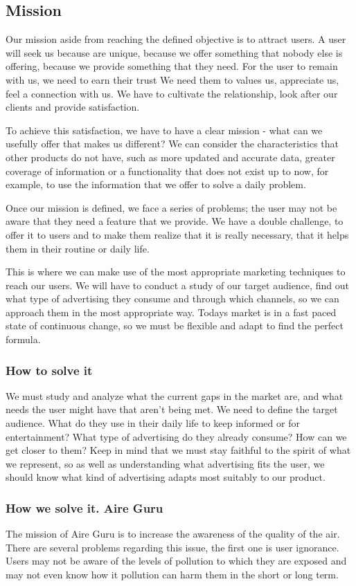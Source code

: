 \subsection{Mission}
Our mission aside from reaching the defined objective is to attract users.
A user will seek us because are unique, because we offer something that
nobody else is offering, because we provide something that they need.
For the user to remain with us, we need to earn their trust We need them to values us, appreciate us, feel a connection with us.
We have to cultivate the relationship, look after our clients and provide satisfaction.

To achieve this satisfaction, we have to have a clear mission - what can we usefully offer that makes us different?
We can consider the characteristics that other products do not have, such as more updated and accurate data,
greater coverage of information or a functionality that does not exist up to now, for example, to use the
information that we offer to solve a daily problem.

Once our mission is defined, we face a series of problems; the user may not be aware that they need a feature that we provide. We have a double challenge, to offer it to users and
to make them realize that it is really necessary, that it helps them in their routine or daily life.

This is where we can make use of the most appropriate marketing techniques to reach our users.
We will have to conduct a study of our target audience, find out what type of advertising they consume and through which channels, so we can approach them in the most appropriate way. Todays market is in a fast paced state of continuous change,
so we must be flexible and adapt to find the perfect formula.

\subsubsection{How to solve it} 
We must study and analyze what the current gaps in the market are, and what needs the user might have that aren't being met.
We need to define the target audience. What do they use in their daily life to keep informed or for entertainment? What type of advertising do they already consume? How can we get closer to them? Keep in mind that we must stay
faithful to the spirit of what we represent, so as well as understanding what advertising fits the user, we should know what kind of advertising
adapts most suitably to our product.
\subsubsection{How we solve it. Aire Guru} 
The mission of Aire Guru is to increase the awareness of the quality of the air.
There are several problems regarding this issue, the first one is user ignorance. Users may not be
aware of the levels of pollution to which they are exposed and may not even know how it pollution can harm them
in the short or long term.

